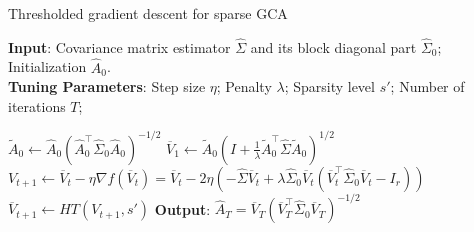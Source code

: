\documentclass[11pt]{article}
\newcommand{\nb}[1]{\textcolor{orange}{\texttt{[#1]}}}
\newcommand{\gsc}[1]{\textcolor{blue}{\texttt{[#1]}}}
\newcommand{\norminit}{\widetilde{A}_0} %
\newcommand{\bA}{\widehat{A}}
\newcommand{\hs}{s'}
\newcommand{\gd}{\overline{V}}
\newcommand{\so}{\widehat{\Sigma}_0}
\newcommand{\0}{{\mathbf{0}}}
\newcommand{\ssecond}{{\widehat{\Sigma}}}
\newcommand{\szerosecond}{{\widehat{\Sigma}_0}}
\begin{document}
\begin{algorithm}[H]
    \caption{Thresholded gradient descent for sparse GCA}\label{TGD}
    \hspace*{\algorithmicindent}\textbf{Input}: Covariance matrix estimator $\ssecond$ and its block diagonal part $\szerosecond$; Initialization $\bA_0$. \\
    \hspace*{\algorithmicindent}\textbf{Tuning Parameters}: 
      Step size $\eta$; Penalty $\lambda$;  Sparsity level $\hs$; Number of iterations $T$; 
\begin{algorithmic}[1]
      \State $\norminit \gets \bA_0(\bA_0^\top\so\bA_0)^{-1/2}$
      \State $\gd_1\gets\norminit (I+\frac{1}{\lambda}\norminit ^\top\ssecond\norminit )^{1/2}$
    \State $ V_{t+1} \gets \gd_t-\eta\nabla f(\gd_t)=\gd_t-2\eta(-\ssecond\gd_t+\lambda \szerosecond\gd_t(\gd_t^\top\szerosecond\gd_t-I_r))$
    \State $\gd_{t+1}\gets HT(V_{t+1},\hs)$
    \EndFor
\textbf{Output}: $\widehat{A}_T=\gd_T(\gd_T^\top\so\gd_T)^{-1/2}$

    \end{algorithmic}
    \end{algorithm}
\end{document}
